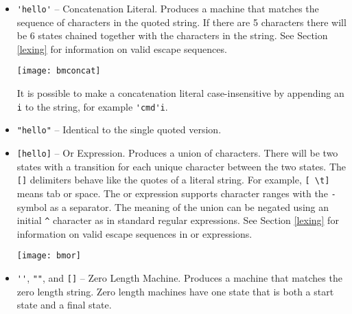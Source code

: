 \documentclass[letterpaper,11pt,oneside]{book}
\begin{document}
\begin{itemize}

\item \verb|'hello'| -- Concatenation Literal. Produces a machine that matches
the sequence of characters in the quoted string. If there are 5 characters
there will be 6 states chained together with the characters in the string. See
Section \ref{lexing} for information on valid escape sequences. 

\begin{comment}
\begin{verbatim}
main := 'hello';
\end{verbatim}
\end{comment}

\begin{center}
\texttt{[image: bmconcat]}
\end{center}

It is possible
to make a concatenation literal case-insensitive by appending an \verb|i| to
the string, for example \verb|'cmd'i|.

\item \verb|"hello"| -- Identical to the single quoted version.

\item \verb|[hello]| -- Or Expression. Produces a union of characters.  There
will be two states with a transition for each unique character between the two states.
The \verb|[]| delimiters behave like the quotes of a literal string. For example, 
\verb|[ \t]| means tab or space. The or expression supports character ranges
with the \verb|-| symbol as a separator. The meaning of the union can be negated
using an initial \verb|^| character as in standard regular expressions. 
See Section \ref{lexing} for information on valid escape sequences
in or expressions.

\begin{comment}
\begin{verbatim}
main := [hello];
\end{verbatim}
\end{comment}

\begin{center}
\texttt{[image: bmor]}
\end{center}

\item \verb|''|, \verb|""|, and \verb|[]| -- Zero Length Machine.  Produces a machine
that matches the zero length string. Zero length machines have one state that is both
a start state and a final state.


\end{itemize}
\end{document}
